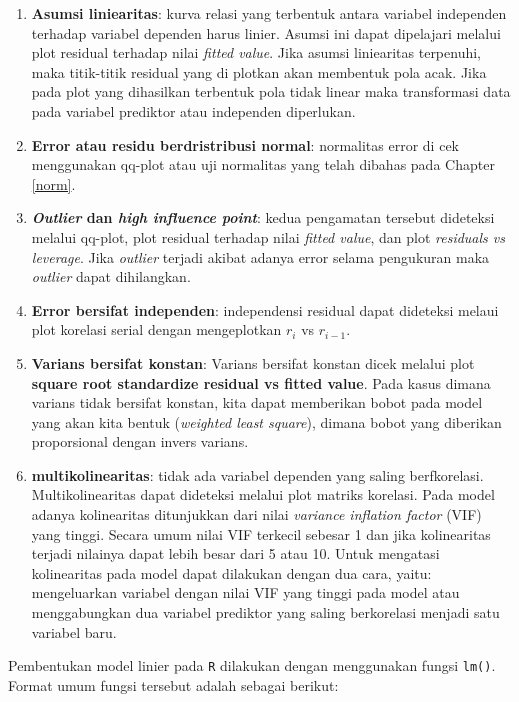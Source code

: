 \documentclass[]{book}
\providecommand{\tightlist}{%
  \setlength{\itemsep}{0pt}\setlength{\parskip}{0pt}}
\theoremstyle{definition}
\theoremstyle{definition}
\theoremstyle{definition}
\theoremstyle{remark}
\begin{document}
\begin{enumerate}
\def\labelenumi{\arabic{enumi}.}
\tightlist
\item
  \textbf{Asumsi liniearitas}: kurva relasi yang terbentuk antara variabel independen terhadap variabel dependen harus linier. Asumsi ini dapat dipelajari melalui plot residual terhadap nilai \emph{fitted value}. Jika asumsi liniearitas terpenuhi, maka titik-titik residual yang di plotkan akan membentuk pola acak. Jika pada plot yang dihasilkan terbentuk pola tidak linear maka transformasi data pada variabel prediktor atau independen diperlukan.
\item
  \textbf{Error atau residu berdristribusi normal}: normalitas error di cek menggunakan qq-plot atau uji normalitas yang telah dibahas pada Chapter \ref{norm}.
\item
  \textbf{\emph{Outlier} dan \emph{high influence point}}: kedua pengamatan tersebut dideteksi melalui qq-plot, plot residual terhadap nilai \emph{fitted value}, dan plot \emph{residuals vs leverage}. Jika \emph{outlier} terjadi akibat adanya error selama pengukuran maka \emph{outlier} dapat dihilangkan.
\item
  \textbf{Error bersifat independen}: independensi residual dapat dideteksi melaui plot korelasi serial dengan mengeplotkan \(r_i\) vs \(r_{i-1}\).
\item
  \textbf{Varians bersifat konstan}: Varians bersifat konstan dicek melalui plot \textbf{square root standardize residual vs fitted value}. Pada kasus dimana varians tidak bersifat konstan, kita dapat memberikan bobot pada model yang akan kita bentuk (\emph{weighted least square}), dimana bobot yang diberikan proporsional dengan invers varians.
\item
  \textbf{multikolinearitas}: tidak ada variabel dependen yang saling berfkorelasi. Multikolinearitas dapat dideteksi melalui plot matriks korelasi. Pada model adanya kolinearitas ditunjukkan dari nilai \emph{variance inflation factor} (VIF) yang tinggi. Secara umum nilai VIF terkecil sebesar 1 dan jika kolinearitas terjadi nilainya dapat lebih besar dari 5 atau 10. Untuk mengatasi kolinearitas pada model dapat dilakukan dengan dua cara, yaitu: mengeluarkan variabel dengan nilai VIF yang tinggi pada model atau menggabungkan dua variabel prediktor yang saling berkorelasi menjadi satu variabel baru.
\end{enumerate}

Pembentukan model linier pada \texttt{R} dilakukan dengan menggunakan fungsi \texttt{lm()}. Format umum fungsi tersebut adalah sebagai berikut:
\end{document}
